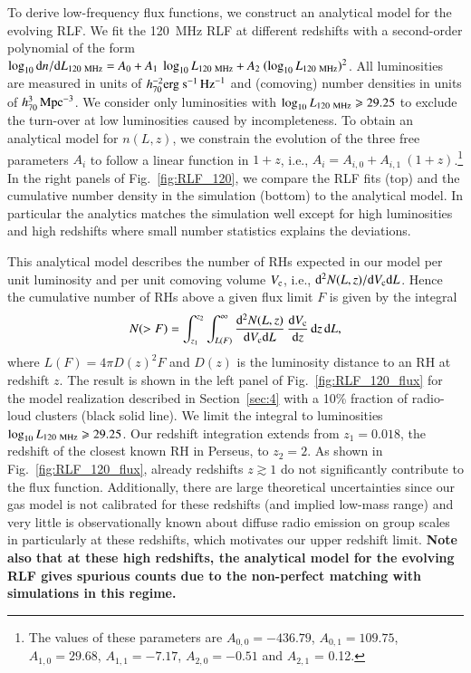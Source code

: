 \documentclass[useAMS,usenatbib]{mn2e}
\begin{document}
To derive low-frequency flux functions, we construct an analytical model for the
evolving RLF. We fit the 120~MHz RLF at different redshifts with a second-order
polynomial of the form $\log_{10} {\mathrm{d}}n/{\mathrm{d}}L_{120~{\mathrm{MHz}}} = A_{0} +
A_{1}~\log_{10} L_{120~{\mathrm{MHz}}} + A_{2}~(\log_{10} L_{120~{\mathrm{MHz}}})^{2}$.
All luminosities are measured in units of $h_{70}^{-2}
{\mathrm{erg~s}}^{-1}\,{\mathrm{Hz}}^{-1}$ and (comoving) number densities in units of
$h_{70}^{3}\,{\mathrm{Mpc}}^{-3}$. We consider only luminosities with $\log_{10}
L_{120~{\mathrm{MHz}}} \geqslant 29.25$ to exclude the turn-over at low luminosities
caused by incompleteness. To obtain an analytical model for $n(L,z)$, we
constrain the evolution of the three free parameters $A_i$ to follow a linear
function in $1+z$, i.e., $A_{i} = A_{i,0} + A_{i,1}~(1+z)$.\footnote{The values
  of these parameters are $A_{0,0} = -436.79$, $A_{0,1} = 109.75$, $A_{1,0} =
  29.68$, $A_{1,1} = -7.17$, $A_{2,0} = -0.51$ and $A_{2,1}$ = 0.12.} In the
right panels of Fig.~\ref{fig:RLF_120}, we compare the RLF fits (top) and the
cumulative number density in the simulation (bottom) to the analytical model. In
particular the analytics matches the simulation well except for high
luminosities and high redshifts where small number statistics explains the
deviations.

This analytical model describes the number of RHs expected in our model per unit
luminosity and per unit comoving volume $V_{{\mathrm{c}}}$, i.e., ${\mathrm{d}}^2N(L,z)
/{\mathrm{d}}V_{{\mathrm{c}}}{\mathrm{d}}L$. Hence the cumulative number of RHs above a given flux
limit $F$ is given by the integral
\begin{equation}
N(>F)  =  \int_{z_1}^{z_2} \int_{L(F)}^{\infty} 
\frac{{\mathrm{d}}^2N(L,z)}{{\mathrm{d}}V_{{\mathrm{c}}}{\mathrm{d}}L}\,
\frac{{\mathrm{d}}V_{{\mathrm{c}}}}{{\mathrm{d}}z}\, {\mathrm{d}}z\, {\mathrm{d}}L ,
\label{eq:NtotRH}
\end{equation}
where $L(F) = 4 \pi D(z)^2 F$ and $D(z)$ is the luminosity distance to an RH at
redshift $z$.  The result is shown in the left panel of
Fig.~\ref{fig:RLF_120_flux} for the model realization described in
Section~\ref{sec:4} with a 10\% fraction of radio-loud clusters (black solid
line). We limit the integral to luminosities $\log_{10} L_{120~{\mathrm{MHz}}}
\geqslant 29.25$. Our redshift integration extends from $z_{1} = 0.018$, the redshift
of the closest known RH in Perseus, to $z_{2} = 2$. As shown in
Fig.~\ref{fig:RLF_120_flux}, already redshifts $z\gtrsim1$ do not
significantly contribute to the flux function. Additionally, there are large
theoretical uncertainties since our gas model is not calibrated for these
redshifts (and implied low-mass range) and very little is observationally known
about diffuse radio emission on group scales in particularly at these redshifts,
which motivates our upper redshift limit. {\bf Note also that at these high redshifts, 
the analytical model for the evolving RLF gives spurious counts due to the 
non-perfect matching with simulations in this regime.}
\end{document}
